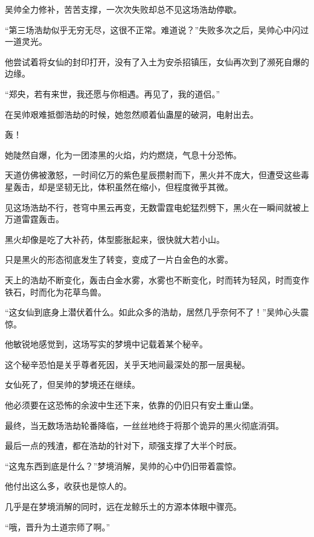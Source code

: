 \begin{this_body}
吴帅全力修补，苦苦支撑，一次次失败却总不见这场浩劫停歇。

“第三场浩劫似乎无穷无尽，这很不正常。难道说？”失败多次之后，吴帅心中闪过一道灵光。

他尝试着将女仙的封印打开，没有了入土为安杀招镇压，女仙再次到了濒死自爆的边缘。

“郑央，若有来世，我还愿与你相遇。再见了，我的道侣。”

在吴帅艰难抵御浩劫的时候，她忽然顺着仙蛊屋的破洞，电射出去。

轰！

她陡然自爆，化为一团漆黑的火焰，灼灼燃烧，气息十分恐怖。

天道仿佛被激怒，一时间亿万的紫色星辰攒射而下，黑火并不庞大，但遭受这些毒星轰击，却是坚韧无比，体积虽然在缩小，但程度微乎其微。

见这场浩劫不行，苍穹中黑云再变，无数雷霆电蛇猛烈劈下，黑火在一瞬间就被上万道雷霆轰击。

黑火却像是吃了大补药，体型膨胀起来，很快就大若小山。

只是黑火的形态彻底发生了转变，变成了一片白金色的水雾。

天上的浩劫不断变化，轰击白金水雾，水雾也不断变化，时而转为轻风，时而变作铁石，时而化为花草鸟兽。

“这女仙到底身上潜伏着什么。如此众多的浩劫，居然几乎奈何不了！”吴帅心头震惊。

他敏锐地感觉到，这场写实的梦境中记载着某个秘辛。

这个秘辛恐怕是关乎尊者死因，关乎天地间最深处的那一层奥秘。

女仙死了，但吴帅的梦境还在继续。

他必须要在这恐怖的余波中生还下来，依靠的仍旧只有安土重山堡。

最终，当无数场浩劫轮番降临，一丝丝地终于将那个诡异的黑火彻底消弭。

最后一点的残渣，都在浩劫的针对下，顽强支撑了大半个时辰。

“这鬼东西到底是什么？”梦境消解，吴帅的心中仍旧带着震惊。

他付出这么多，收获也是惊人的。

几乎是在梦境消解的同时，远在龙鲸乐土的方源本体眼中骤亮。

“哦，晋升为土道宗师了啊。”

\end{this_body}

